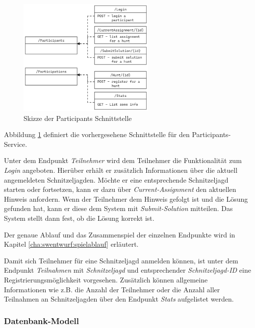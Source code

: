 \begin{figure}[H]
    \centering
    \includegraphics[width=0.6\textwidth]{images/PrAr-Software-Entwurf-Hunt-Api-Participant-Service-Endpoints.png}
    \caption{Skizze der Participants Schnittstelle}
    \label{fig:swentwurf:huntapi:participantservice:endpoints}
\end{figure}

Abbildung \ref{fig:swentwurf:huntapi:participantservice:endpoints} definiert die vorhergesehene Schnittstelle für den Participants-Service.

Unter dem Endpunkt \textit{Teilnehmer} wird dem Teilnehmer die Funktionalität zum \textit{Login} angeboten. Hierüber erhält er zusätzlich Informationen über die aktuell angemeldeten Schnitzeljagden. Möchte er eine entsprechende Schnitzeljagd starten oder fortsetzen, kann er dazu über \textit{Current-Assignment} den aktuellen Hinweis anfordern. Wenn der Teilnehmer dem Hinweis gefolgt ist und die Lösung gefunden hat, kann er diese dem System mit \textit{Submit-Solution} mitteilen. Das System stellt dann fest, ob die Lösung korrekt ist.

Der genaue Ablauf und das Zusammenspiel der einzelnen Endpunkte wird in Kapitel \ref{cha:swentwurf:spielablauf} erläutert.

Damit sich Teilnehmer für eine Schnitzeljagd anmelden können, ist unter dem Endpunkt \textit{Teilnahmen} mit \textit{Schnitzeljagd} und entsprechender \textit{Schnitzeljagd-ID} eine Registrierungsmöglichkeit vorgesehen. Zusätzlich können allgemeine Informationen wie z.B. die Anzahl der Teilnehmer oder die Anzahl aller Teilnahmen an Schnitzeljagden über den Endpunkt \textit{Stats} aufgelistet werden.

\subsubsection{Datenbank-Modell}

